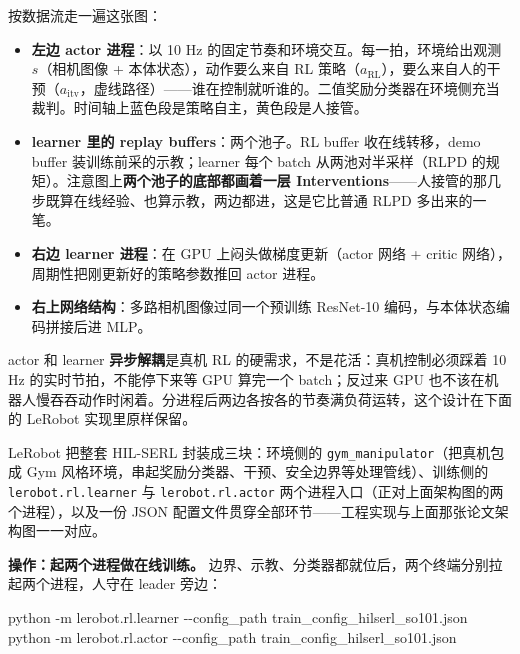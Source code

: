 \documentclass[
  chinese,
]{ctexart}
\newenvironment{Shaded}{\begin{snugshade}}{\end{snugshade}}
\newcommand{\AttributeTok}[1]{\textcolor[rgb]{0.40,0.45,0.13}{#1}}
\newcommand{\ExtensionTok}[1]{\textcolor[rgb]{0.00,0.23,0.31}{#1}}
\newcommand{\NormalTok}[1]{\textcolor[rgb]{0.00,0.23,0.31}{#1}}
\providecommand{\tightlist}{%
  \setlength{\itemsep}{0pt}\setlength{\parskip}{0pt}}
\begin{document}
按数据流走一遍这张图：

\begin{itemize}
\tightlist
\item
  \textbf{左边 actor 进程}：以 10 Hz
  的固定节奏和环境交互。每一拍，环境给出观测 \(s\)（相机图像 +
  本体状态），动作要么来自 RL
  策略（\(a_{\mathrm{RL}}\)），要么来自人的干预（\(a_{\mathrm{itv}}\)，虚线路径）------谁在控制就听谁的。二值奖励分类器在环境侧充当裁判。时间轴上蓝色段是策略自主，黄色段是人接管。
\item
  \textbf{learner 里的 replay buffers}：两个池子。RL buffer
  收在线转移，demo buffer 装训练前采的示教；learner 每个 batch
  从两池对半采样（RLPD
  的规矩）。注意图上\textbf{两个池子的底部都画着一层
  Interventions}------人接管的那几步既算在线经验、也算示教，两边都进，这是它比普通
  RLPD 多出来的一笔。
\item
  \textbf{右边 learner 进程}：在 GPU 上闷头做梯度更新（actor 网络 +
  critic 网络），周期性把刚更新好的策略参数推回 actor 进程。
\item
  \textbf{右上网络结构}：多路相机图像过同一个预训练 ResNet-10
  编码，与本体状态编码拼接后进 MLP。
\end{itemize}

actor 和 learner \textbf{异步解耦}是真机 RL
的硬需求，不是花活：真机控制必须踩着 10 Hz 的实时节拍，不能停下来等 GPU
算完一个 batch；反过来 GPU
也不该在机器人慢吞吞动作时闲着。分进程后两边各按各的节奏满负荷运转，这个设计在下面的
LeRobot 实现里原样保留。

LeRobot 把整套 HIL-SERL 封装成三块：环境侧的
\texttt{gym\_manipulator}（把真机包成 Gym
风格环境，串起奖励分类器、干预、安全边界等处理管线）、训练侧的
\texttt{lerobot.rl.learner} 与 \texttt{lerobot.rl.actor}
两个进程入口（正对上面架构图的两个进程），以及一份 JSON
配置文件贯穿全部环节------工程实现与上面那张论文架构图一一对应。

\textbf{操作：起两个进程做在线训练。}
边界、示教、分类器都就位后，两个终端分别拉起两个进程，人守在 leader
旁边：

\begin{Shaded}
\begin{Highlighting}[]
\ExtensionTok{python} \AttributeTok{{-}m}\NormalTok{ lerobot.rl.learner }\AttributeTok{{-}{-}config\_path}\NormalTok{ train\_config\_hilserl\_so101.json}
\ExtensionTok{python} \AttributeTok{{-}m}\NormalTok{ lerobot.rl.actor   }\AttributeTok{{-}{-}config\_path}\NormalTok{ train\_config\_hilserl\_so101.json}
\end{Highlighting}
\end{Shaded}
\end{document}
